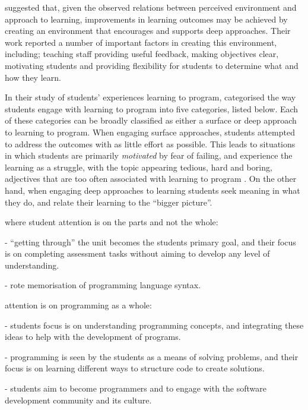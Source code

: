 \citet{Trigwell:1999} suggested that, given the observed relations between perceived environment and approach to learning, improvements in learning outcomes may be achieved by creating an environment that encourages and supports deep approaches.  Their work reported a number of important factors in creating this environment, including; teaching staff providing useful feedback, making objectives clear, motivating students and providing flexibility for students to determine what and how they learn. 

In their study of students' experiences learning to program, \citet{Bruce:2003} categorised the way students engage with learning to program into five categories, listed below. Each of these categories can be broadly classified as either a surface or deep approach to learning to program. When engaging surface approaches, students attempted to address the outcomes with as little effort as possible. This leads to situations in which students are primarily \emph{motivated} by fear of failing, and experience the learning as a struggle, with the topic appearing tedious, hard and boring, adjectives that are too often associated with learning to program \cite{McGettrick:2005}. On the other hand, when engaging deep approaches to learning students seek meaning in what they do, and relate their learning to the ``bigger picture''. 

\begin{description}
	\item[Surface Approaches] where student attention is on the parts and not the whole:
	\begin{description}
		\item[Following] - ``getting through'' the unit becomes the students primary goal, and their focus is on completing assessment tasks without aiming to develop any level of understanding.
		\item[Coding] - rote memorisation of programming language syntax.
	\end{description}
	\item[Deep Approaches] attention is on programming as a whole:
	\begin{description}
		\item[Understanding and integrating concepts] - students focus is on understanding programming concepts, and integrating these ideas to help with the development of programs.
		\item[Problem solving] -  programming is seen by the students as a means of solving problems, and their focus is on learning different ways to structure code to create solutions.
		\item[Participation/enculturation] - students aim to become programmers and to engage with the software development community and its culture.
	\end{description}
\end{description}

